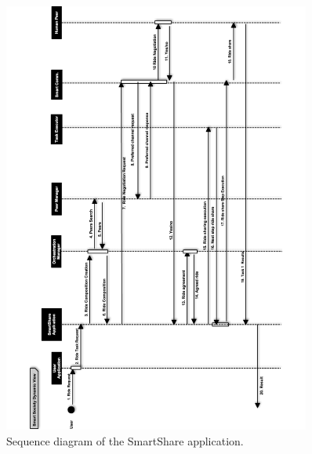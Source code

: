 \begin{figure}
\centering
\includegraphics[width=0.9\textwidth]{./figs/sequenceRide}
\caption{Sequence diagram of the SmartShare application.}
\label{fig:smartshare}
\end{figure}
